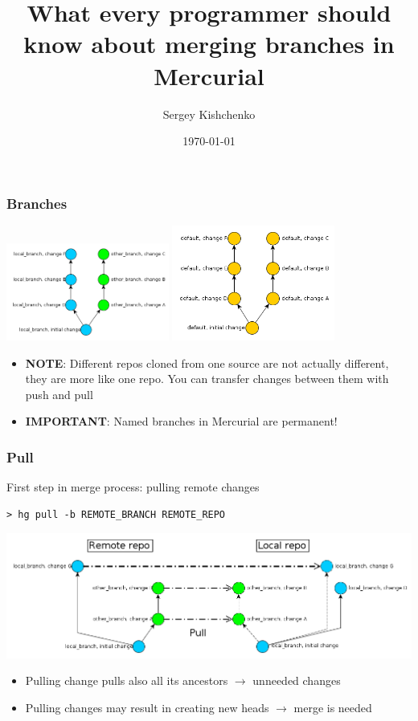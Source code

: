 \documentclass{beamer}
\title{What every programmer should know about merging branches in Mercurial}
\author{Sergey Kishchenko}
\date{\today}
\institute{DoctorMobile}
\begin{document}
\frame{\titlepage}

\begin{frame} 
\frametitle{Branches}
\begin{multicols}{2}
\includegraphics[width=0.4\textwidth]{img/two_branches}
\columnbreak
{}
\includegraphics[width=0.4\textwidth]{img/two_default_branches}
\end{multicols}
\begin{itemize}
\item \textbf{NOTE}: Different repos cloned from one source are not actually different, they are more like one repo. You can transfer changes between them with push and pull
\item \textbf{IMPORTANT}: Named branches in Mercurial are permanent!
\end{itemize}
\end{frame}

\begin{frame}[fragile]
\frametitle{Pull}
\begin{exampleblock}{First step in merge process: pulling remote changes}
\begin{verbatim}
> hg pull -b REMOTE_BRANCH REMOTE_REPO
\end{verbatim}
\end{exampleblock}
\includegraphics[width=\textwidth]{img/pull_branches}
\begin{itemize}
\item Pulling change pulls also all its ancestors $\to$ unneeded changes
\item Pulling changes may result in creating new heads $\to$ merge is needed
\end{itemize}
\end{frame}
\end{document}

